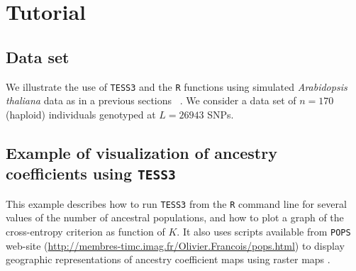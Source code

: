 \documentclass[10pt,a4paper]{article}
\begin{document}
\section{Tutorial}

\subsection{Data set}

We illustrate the use of {\tt TESS3} and the {\tt R} functions using simulated {\it Arabidopsis thaliana} data as in a previous sections ~\cite{atwell2010genome}. We consider a data set of $n = 170$ (haploid) individuals genotyped at $L = 26943$ SNPs.

\subsection{Example of visualization of ancestry coefficients using {\tt TESS3}}

This example describes how to run {\tt TESS3} from the {\tt R} command line for several values of the number of ancestral populations, and how to plot a graph of the cross-entropy criterion as function of $K$. It also uses scripts available from {\tt POPS} web-site (\url{http://membres-timc.imag.fr/Olivier.Francois/pops.html}) to display geographic representations of ancestry coefficient maps using raster maps \cite{jay2012forecasting}. 

\end{document}
